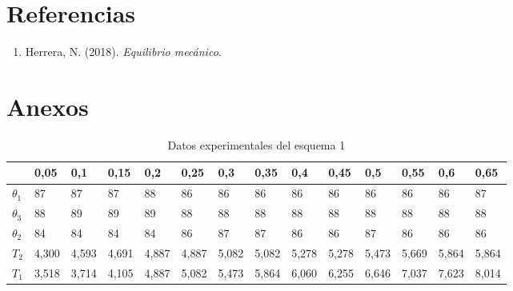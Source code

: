 \documentclass[a4paper]{article}
\begin{document}
\section{Referencias}
\begin{enumerate}
    \item Herrera, N. (2018). \textit{Equilibrio mecánico}.
\end{enumerate}

\section{Anexos}

\begin{table}[H]
\centering
\begin{tabular}{l|l|l|l|l|l|l|l|l|l|l|l|l|l|}
\cline{2-14}
\textbf{}                          & 0,05   & 0,1    & 0,15   & 0,2    & 0,25   & 0,3    & 0,35   & 0,4    & 0,45   & 0,5    & 0,55   & 0,6    & 0,65   \\ \hline
\multicolumn{1}{|l|}{\textbf{$\theta_1$}}   & 87     & 87     & 87     & 88     & 86     & 86     & 86     & 86     & 86     & 86     & 86     & 86     & 87     \\ \hline
\multicolumn{1}{|l|}{\textbf{$\theta_3$}} & 88     & 89     & 89     & 89     & 88     & 88     & 88     & 88     & 88     & 88     & 88     & 88     & 88     \\ \hline
\multicolumn{1}{|l|}{\textbf{$\theta_2$}}   & 84     & 84     & 84     & 84     & 86     & 87     & 87     & 86     & 86     & 87     & 86     & 86     & 86     \\ \hline
\multicolumn{1}{|l|}{\textbf{$T_2$}}  & 4,300 & 4,593 & 4,691 & 4,887 & 4,887 & 5,082 & 5,082 & 5,278 & 5,278 & 5,473 & 5,669 & 5,864 & 5,864 \\ \hline
\multicolumn{1}{|l|}{\textbf{$T_1$}}  & 3,518 & 3,714 & 4,105 & 4,887 & 5,082 & 5,473 & 5,864 & 6,060 & 6,255 & 6,646 & 7,037 & 7,623 & 8,014 \\ \hline
\end{tabular}
\caption{Datos experimentales del esquema 1}
\end{table}
\end{document}
